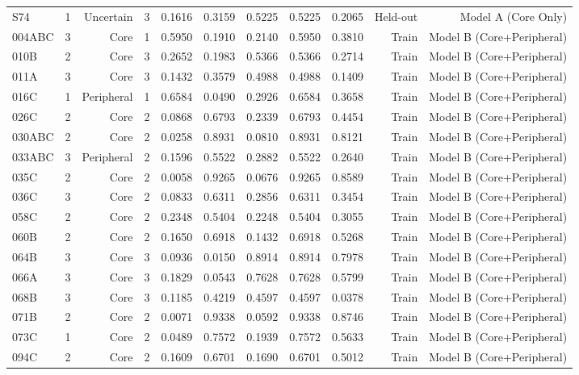 {\begin{longtable}{lrrrrrrrrrr}
  S74 & 1 & Uncertain & 3 & 0.1616 & 0.3159 & 0.5225 & 0.5225 & 0.2065 & Held-out & Model A (Core Only) \\
  004ABC & 3 & Core & 1 & 0.5950 & 0.1910 & 0.2140 & 0.5950 & 0.3810 & Train & Model B (Core+Peripheral) \\
  010B & 2 & Core & 3 & 0.2652 & 0.1983 & 0.5366 & 0.5366 & 0.2714 & Train & Model B (Core+Peripheral) \\
  011A & 3 & Core & 3 & 0.1432 & 0.3579 & 0.4988 & 0.4988 & 0.1409 & Train & Model B (Core+Peripheral) \\
  016C & 1 & Peripheral & 1 & 0.6584 & 0.0490 & 0.2926 & 0.6584 & 0.3658 & Train & Model B (Core+Peripheral) \\
  026C & 2 & Core & 2 & 0.0868 & 0.6793 & 0.2339 & 0.6793 & 0.4454 & Train & Model B (Core+Peripheral) \\
  030ABC & 2 & Core & 2 & 0.0258 & 0.8931 & 0.0810 & 0.8931 & 0.8121 & Train & Model B (Core+Peripheral) \\
  033ABC & 3 & Peripheral & 2 & 0.1596 & 0.5522 & 0.2882 & 0.5522 & 0.2640 & Train & Model B (Core+Peripheral) \\
  035C & 2 & Core & 2 & 0.0058 & 0.9265 & 0.0676 & 0.9265 & 0.8589 & Train & Model B (Core+Peripheral) \\
  036C & 3 & Core & 2 & 0.0833 & 0.6311 & 0.2856 & 0.6311 & 0.3454 & Train & Model B (Core+Peripheral) \\
  058C & 2 & Core & 2 & 0.2348 & 0.5404 & 0.2248 & 0.5404 & 0.3055 & Train & Model B (Core+Peripheral) \\
  060B & 2 & Core & 2 & 0.1650 & 0.6918 & 0.1432 & 0.6918 & 0.5268 & Train & Model B (Core+Peripheral) \\
  064B & 3 & Core & 3 & 0.0936 & 0.0150 & 0.8914 & 0.8914 & 0.7978 & Train & Model B (Core+Peripheral) \\
  066A & 3 & Core & 3 & 0.1829 & 0.0543 & 0.7628 & 0.7628 & 0.5799 & Train & Model B (Core+Peripheral) \\
  068B & 3 & Core & 3 & 0.1185 & 0.4219 & 0.4597 & 0.4597 & 0.0378 & Train & Model B (Core+Peripheral) \\
  071B & 2 & Core & 2 & 0.0071 & 0.9338 & 0.0592 & 0.9338 & 0.8746 & Train & Model B (Core+Peripheral) \\
  073C & 1 & Core & 2 & 0.0489 & 0.7572 & 0.1939 & 0.7572 & 0.5633 & Train & Model B (Core+Peripheral) \\
  094C & 2 & Core & 2 & 0.1609 & 0.6701 & 0.1690 & 0.6701 & 0.5012 & Train & Model B (Core+Peripheral) \\

\end{longtable}}
